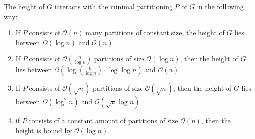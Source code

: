 \begin{lemma}\label{l:partition_binary_tree_lower_upper_bounds}
	The height of $G$ interacts with the minimal partitioning $P$ of $G$ in the following way:
	\begin{enumerate}
		\item If $P$ consists of $\mathcal{O}(n)$ many partitions of constant size, the height of $G$ lies between $\Omega(\log n)$ and $\mathcal{O}(n)$
		\item If $P$ consists of $\mathcal{O}\left(\frac{n}{\log n}\right)$ partitions of size $\mathcal{O}(\log n)$, then the height of $G$ lies between $\Omega\left(\log\left(\frac{n}{\log n}\right)\cdot \log \log n \right)$ and $\mathcal{O}\left( n\right)$
		\item If $P$ consists of $\mathcal{O}(\sqrt{n})$ partitions of size $\mathcal{O}(\sqrt{n})$, then the height of $G$ lies between $\Omega(\log^2 n)$ and $\mathcal{O}(\sqrt{n}\log n)$
		\item if $P$ consists of a constant amount of partitions of size $\mathcal{O}(n)$, then the height is bound by $\mathcal{O}(\log n)$.
	\end{enumerate}
\end{lemma}

